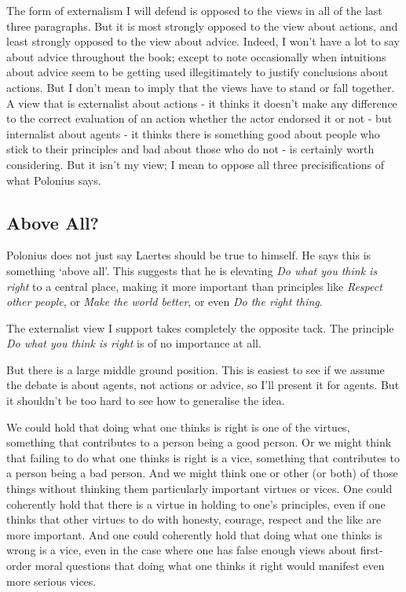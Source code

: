 The form of externalism I will defend is opposed to the views in all of the last three paragraphs. But it is most strongly opposed to the view about actions, and least strongly opposed to the view about advice. Indeed, I won't have a lot to say about advice throughout the book; except to note occasionally when intuitions about advice seem to be getting used illegitimately to justify conclusions about actions. But I don't mean to imply that the views have to stand or fall together. A view that is externalist about actions - it thinks it doesn't make any difference to the correct evaluation of an action whether the actor endorsed it or not - but internalist about agents - it thinks there is something good about people who stick to their principles and bad about those who do not - is certainly worth considering. But it isn't my view; I mean to oppose all three precisifications of what Polonius says.

\subsection{Above All?}
\label{aboveall}

Polonius does not just say Laertes should be true to himself. He says this is something `above all'. This suggests that he is elevating \emph{Do what you think is right} to a central place, making it more important than principles like \emph{Respect other people}, or \emph{Make the world better}, or even \emph{Do the right thing}.

The externalist view I support takes completely the opposite tack. The principle \emph{Do what you think is right} is of no importance at all.

But there is a large middle ground position. This is easiest to see if we assume the debate is about agents, not actions or advice, so I'll present it for agents. But it shouldn't be too hard to see how to generalise the idea.

We could hold that doing what one thinks is right is one of the virtues, something that contributes to a person being a good person. Or we might think that failing to do what one thinks is right is a vice, something that contributes to a person being a bad person. And we might think one or other (or both) of those things without thinking them particularly important virtues or vices. One could coherently hold that there is a virtue in holding to one's principles, even if one thinks that other virtues to do with honesty, courage, respect and the like are more important. And one could coherently hold that doing what one thinks is wrong is a vice, even in the case where one has false enough views about first-order moral questions that doing what one thinks it right would manifest even more serious vices.

